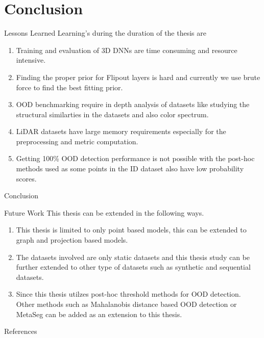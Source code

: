 \documentclass[aspectratio=169]{beamer}
\begin{document}
\section{Conclusion}
\begin{frame}{Lessons Learned}
    Learning's during the duration of the thesis are
    \begin{enumerate}
        \item Training and evaluation of 3D DNNs are time consuming and resource intensive.
        \item Finding the proper prior for Flipout layers is hard and currently we use brute force to find the best fitting prior.
        \item OOD benchmarking require in depth analysis of datasets like studying the structural similarties in the datasets and also color spectrum.
        \item LiDAR datasets have large memory requirements especially for the preprocessing and metric computation.
        \item Getting 100\% OOD detection performance is not possible with the post-hoc methods used as some points in the ID dataset also have low probability scores.
    \end{enumerate}
\end{frame}
\begin{frame}{Conclusion}
    
\end{frame}
\begin{frame}{Future Work}
    This thesis can be extended in the following ways.
    \begin{enumerate}
        \item This thesis is limited to only point based models, this can be extended to graph and projection based models.
        \item The datasets involved are only static datasets and this thesis study can be further extended to other type of datasets such as synthetic and sequential datasets.
        \item Since this thesis utilzes post-hoc threshold methods for OOD detection. Other methods such as Mahalanobis distance based OOD detection \cite{lee2018simple_mahalanobis} or MetaSeg \cite{MetaSeg} can be added as an extension to this thesis.
    \end{enumerate}
\end{frame}
\begin{frame}{References}
    
    

\end{frame}
\end{document}

